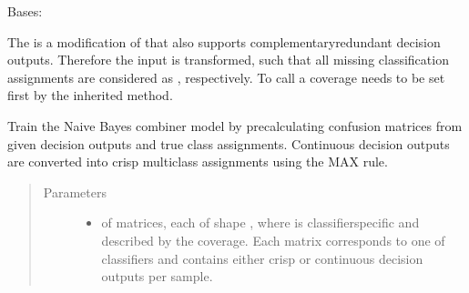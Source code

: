 \documentclass[letterpaper,10pt,english]{sphinxmanual}
\begin{document}
\begin{fulllineitems}
\label{\detokenize{pusion.core.naive_bayes_combiner:pusion.core.naive_bayes_combiner.CRNaiveBayesCombiner}}
\sphinxAtStartPar
Bases: {\hyperref[\detokenize{pusion.core.naive_bayes_combiner:pusion.core.naive_bayes_combiner.NaiveBayesCombiner}]{}}

\sphinxAtStartPar
The {\hyperref[\detokenize{pusion.core.naive_bayes_combiner:pusion.core.naive_bayes_combiner.CRNaiveBayesCombiner}]{}} is a modification of {\hyperref[\detokenize{pusion.core.naive_bayes_combiner:pusion.core.naive_bayes_combiner.NaiveBayesCombiner}]{}} that
also supports complementary\sphinxhyphen{}redundant decision outputs. Therefore the input is transformed, such that all missing
classification assignments are considered as , respectively. To call {\hyperref[\detokenize{pusion.core.naive_bayes_combiner:pusion.core.naive_bayes_combiner.CRNaiveBayesCombiner.combine}]{}} a coverage needs to be set
first by the inherited  method.

\begin{fulllineitems}
\label{\detokenize{pusion.core.naive_bayes_combiner:pusion.core.naive_bayes_combiner.CRNaiveBayesCombiner.train}}
\sphinxAtStartPar
Train the Naive Bayes combiner model by precalculating confusion matrices from given decision outputs and
true class assignments. Continuous decision outputs are converted into crisp multiclass assignments using
the MAX rule.
\begin{quote}\begin{description}
\item[{Parameters}] \leavevmode\begin{itemize}
\item {} 
\sphinxAtStartPar
{} \textendash{}  of  matrices, each of shape ,
where  is classifier\sphinxhyphen{}specific and described by the coverage.
Each matrix corresponds to one of  classifiers and contains either crisp or continuous
decision outputs per sample.


\end{itemize}
\end{description}
\end{quote}
\end{fulllineitems}
\end{fulllineitems}
\end{document}
